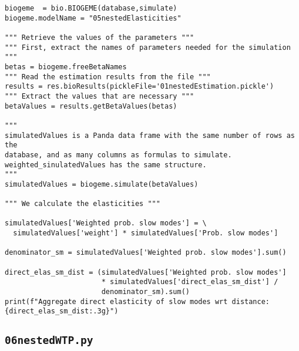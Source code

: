 \documentclass[12pt,a4paper]{article}
\begin{document}
\begin{lstlisting}[style=numbers]
biogeme  = bio.BIOGEME(database,simulate)
biogeme.modelName = "05nestedElasticities"

""" Retrieve the values of the parameters """
""" First, extract the names of parameters needed for the simulation """
betas = biogeme.freeBetaNames
""" Read the estimation results from the file """
results = res.bioResults(pickleFile='01nestedEstimation.pickle')
""" Extract the values that are necessary """
betaValues = results.getBetaValues(betas)

"""
simulatedValues is a Panda data frame with the same number of rows as the
database, and as many columns as formulas to simulate.
weighted_sinulatedValues has the same structure. 
"""
simulatedValues = biogeme.simulate(betaValues)

""" We calculate the elasticities """

simulatedValues['Weighted prob. slow modes'] = \
  simulatedValues['weight'] * simulatedValues['Prob. slow modes']

denominator_sm = simulatedValues['Weighted prob. slow modes'].sum()

direct_elas_sm_dist = (simulatedValues['Weighted prob. slow modes']
                       * simulatedValues['direct_elas_sm_dist'] /
                       denominator_sm).sum()
print(f"Aggregate direct elasticity of slow modes wrt distance: {direct_elas_sm_dist:.3g}")
\end{lstlisting}

\subsection{\lstinline$06nestedWTP.py$}
\label{sec:06nestedWTP}
\end{document}
